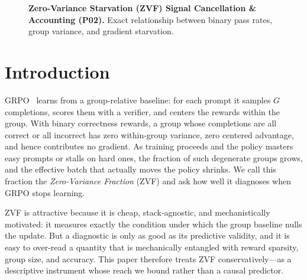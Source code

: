 \documentclass{article}
\begin{document}
\begin{figure}[htbp]
\centering
{}
\caption{\textbf{Zero-Variance Starvation (ZVF) Signal Cancellation \& Accounting (P02).} Exact relationship between binary pass rates, group variance, and gradient starvation.}
\label{fig:p2_zvf_accounting}
\end{figure}
\section{Introduction}
\label{sec:p2-intro}
GRPO~\citep{shao2024deepseekmath, guo2025deepseekr1} learns from a group-relative
baseline: for each prompt it samples $G$ completions, scores them with a verifier,
and centers the rewards within the group. With binary correctness rewards, a group
whose completions are all correct or all incorrect has zero within-group variance,
zero centered advantage, and hence contributes no gradient. As training proceeds
and the policy masters easy prompts or stalls on hard ones, the fraction of such
degenerate groups grows, and the effective batch that actually moves the policy
shrinks. We call this fraction the \emph{Zero-Variance Fraction} (ZVF) and ask how
well it diagnoses when GRPO stops learning.

ZVF is attractive because it is cheap, stack-agnostic, and mechanistically
motivated: it measures exactly the condition under which the group baseline nulls
the update. But a diagnostic is only as good as its predictive validity, and it is
easy to over-read a quantity that is mechanically entangled with reward sparsity,
group size, and accuracy. This paper therefore treats ZVF conservatively---as a
descriptive instrument whose reach we bound rather than a causal predictor.
\end{document}
